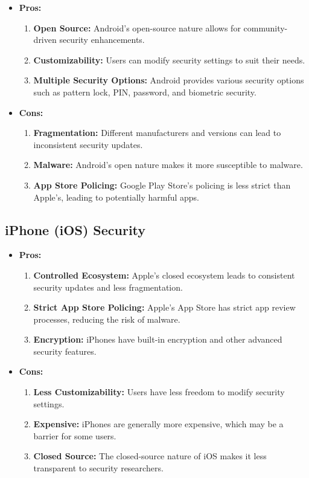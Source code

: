 \documentclass[11pt]{article}
\begin{document}
\begin{itemize}
      \item \textbf{Pros:}
            \begin{enumerate}
                  \item \textbf{Open Source:} Android's open-source nature allows for community-driven security enhancements.
                  \item \textbf{Customizability:} Users can modify security settings to suit their needs.
                  \item \textbf{Multiple Security Options:} Android provides various security options such as pattern lock, PIN, password, and biometric security.
            \end{enumerate}
      \item \textbf{Cons:}
            \begin{enumerate}
                  \item \textbf{Fragmentation:} Different manufacturers and versions can lead to inconsistent security updates.
                  \item \textbf{Malware:} Android's open nature makes it more susceptible to malware.
                  \item \textbf{App Store Policing:} Google Play Store's policing is less strict than Apple's, leading to potentially harmful apps.
            \end{enumerate}
\end{itemize}

\subsection{iPhone (iOS) Security}

\begin{itemize}
      \item \textbf{Pros:}
            \begin{enumerate}
                  \item \textbf{Controlled Ecosystem:} Apple's closed ecosystem leads to consistent security updates and less fragmentation.
                  \item \textbf{Strict App Store Policing:} Apple's App Store has strict app review processes, reducing the risk of malware.
                  \item \textbf{Encryption:} iPhones have built-in encryption and other advanced security features.
            \end{enumerate}
      \item \textbf{Cons:}
            \begin{enumerate}
                  \item \textbf{Less Customizability:} Users have less freedom to modify security settings.
                  \item \textbf{Expensive:} iPhones are generally more expensive, which may be a barrier for some users.
                  \item \textbf{Closed Source:} The closed-source nature of iOS makes it less transparent to security researchers.
            \end{enumerate}
\end{itemize}
\end{document}
